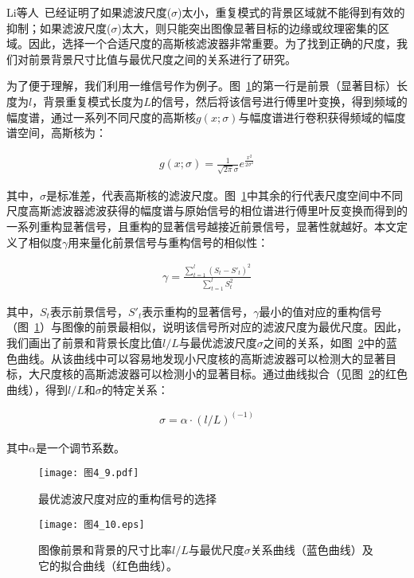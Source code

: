 Li等人~\cite{LiJianTPAMI2013Scale}已经证明了如果滤波尺度($\sigma$)太小，重复模式的背景区域就不能得到有效的抑制；如果滤波尺度($\sigma$)太大，则只能突出图像显著目标的边缘或纹理密集的区域。因此，选择一个合适尺度的高斯核滤波器非常重要。为了找到正确的尺度，我们对前景背景尺寸比值与最优尺度之间的关系进行了研究。

为了便于理解，我们利用一维信号作为例子。图~\ref{图4_9}的第一行是前景（显著目标）长度为$l$，背景重复模式长度为$L$的信号，然后将该信号进行傅里叶变换，得到频域的幅度谱，通过一系列不同尺度的高斯核$g(x;\sigma)$与幅度谱进行卷积获得频域的幅度谱空间，高斯核为：
\begin{linenomath}
\begin{align}
g(x;\sigma)=\frac{1}{\sqrt{2\pi}\sigma}e^{\frac{x^{2}}{2\sigma^{2}}}
\label{式4_5}
\end{align}
\end{linenomath}
其中，$\sigma$是标准差，代表高斯核的滤波尺度。图~\ref{图4_9}中其余的行代表尺度空间中不同尺度高斯滤波器滤波获得的幅度谱与原始信号的相位谱进行傅里叶反变换而得到的一系列重构显著信号，且重构的显著信号越接近前景信号，显著性就越好。本文定义了相似度$\gamma$用来量化前景信号与重构信号的相似性：
\begin{linenomath}
\begin{align}
\gamma=\frac{\sum_{t=1}^{l}(S_{t}-S'_{t})^{2}}{\sum_{t=1}^{l}S_{t}^{2}}
\label{式4_6}
\end{align}
\end{linenomath}
其中，$S_{t}$表示前景信号，$S'_{t}$表示重构的显著信号，$\gamma$最小的值对应的重构信号（图~\ref{图4_9}）与图像的前景最相似，说明该信号所对应的滤波尺度为最优尺度。因此，我们画出了前景和背景长度比值$l/L$与最优滤波尺度$\sigma$之间的关系，如图~\ref{图4_10}中的蓝色曲线。从该曲线中可以容易地发现小尺度核的高斯滤波器可以检测大的显著目标，大尺度核的高斯滤波器可以检测小的显著目标。通过曲线拟合（见图~\ref{图4_10}的红色曲线），得到$l/L$和$\sigma$的特定关系：
\begin{linenomath}
\begin{align}
\sigma=\alpha\cdot(l/L)^{(-1)}
\label{式4_7}
\end{align}
\end{linenomath}
其中$\alpha$是一个调节系数。
\begin{figure}[h]
  \centering
  \texttt{[image: 图4\_9.pdf]}
  \caption{最优滤波尺度对应的重构信号的选择}   
  \label{图4_9} 
\end{figure}
\begin{figure}[h]
  \centering
  \texttt{[image: 图4\_10.eps]}
  \caption{图像前景和背景的尺寸比率$l/L$与最优尺度$\sigma$关系曲线（蓝色曲线）及它的拟合曲线（红色曲线）。}   
  \label{图4_10} 
\end{figure}

